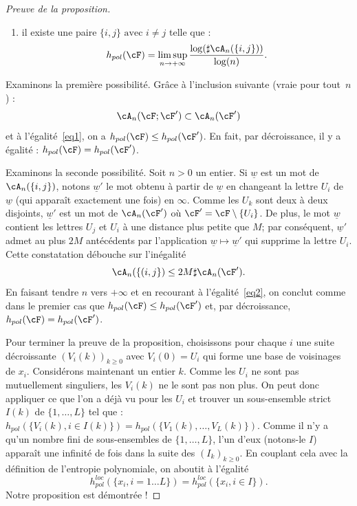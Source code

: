 \begin{proof}[Preuve de la proposition]
\begin{enumerate}
\item \label{item2} il existe une paire $\{i,j\} \text{ avec } i \neq j$ telle que :
\begin{equation}\label{eq2}
h_{pol}(\cF) = \limsup_{n \to +\infty} \frac{\log(\sharp\cA_n(\{i,j\}))}{\log(n)}.
\end{equation}
\end{enumerate}

Examinons la première possibilité. Grâce à l'inclusion suivante (vraie pour tout~$n$) :
\[
\cA_n(\cF;\cF') \subset \cA_n(\cF')
\]
et à l'égalité~\eqref{eq1}, on a $h_{pol}(\cF) \leq h_{pol}(\cF')$. En fait, par décroissance, il y a égalité : $h_{pol}(\cF) = h_{pol}(\cF')$.

Examinons la seconde possibilité. Soit $n>0$ un entier. Si $\underline{w}$ est un mot de $\cA_n(\{i,j\})$, notons $\underline{w}'$ le mot obtenu à partir de $\underline{w}$ en changeant la lettre \og$U_i$\fg{} de $\underline{w}$ (qui apparaît exactement une fois) en \og$\infty$\fg. Comme les $U_k$ sont deux à deux disjoints, $\underline{w}'$ est un mot de $\cA_n(\cF')$ où $\cF'=\cF\setminus\{U_i\}$. De plus, le mot $\underline{w}$ contient les lettres \og$U_j$\fg{} et \og$U_i$\fg{} à une distance plus petite que $M$; par conséquent, $\underline{w}'$ admet au plus ${2M}$ antécédents par l'application $\underline{w} \mapsto \underline{w}'$ qui supprime la lettre \og$U_i$\fg. Cette constatation débouche sur l'inégalité
\[
\cA_n(\{(i,j\}) \leq 2M \sharp \cA_n(\cF').
\]
En faisant tendre $n$ vers $+\infty$ et en recourant à l'égalité~\eqref{eq2}, on conclut comme dans le premier cas que $h_{pol}(\cF) \leq h_{pol}(\cF')$ et, par décroissance, $h_{pol}(\cF) = h_{pol}(\cF')$.

Pour terminer la preuve de la proposition, choisissons pour chaque $i$ une suite décroissante $(V_i(k))_{k \geq 0}$ avec $V_i(0) = U_i$ qui forme une base de voisinages de $x_i$. Considérons maintenant un entier $k$. Comme les $U_i$ ne sont pas mutuellement singuliers, les $V_i(k)$ ne le sont pas non plus. On peut donc appliquer ce que l'on a déjà vu pour les $U_i$ et trouver un sous-ensemble strict $I(k)$ de $\{1, \dots, L\}$ tel que : $ h_{pol}(\{V_i{(k)}, i\in I(k)\}) = h_{pol}(\{V_1(k), \dots, V_L(k)\})$. Comme il n'y a qu'un nombre fini de sous-ensembles de $\{1, \dots, L\}$, l'un d'eux (notons-le $I$) apparaît une infinité de fois dans la suite des $(I_k)_{k\geq 0}$. En couplant cela avec la définition de l'entropie polynomiale, on aboutit à l'égalité
\[
h^{loc}_{pol}(\{x_i, i=1 \dots L\}) = h^{loc}_{pol}(\{x_i, i\in I\}).
\]
Notre proposition est démontrée !
\end{proof}


